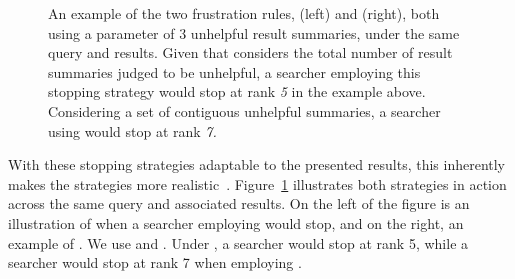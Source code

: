 \begin{figure}[t!]
    \centering
    \caption[Examples of frustration rules  and ]{An example of the two frustration rules,  (left) and  (right), both using a parameter of 3 unhelpful result summaries, under the same query and results. Given that  considers the total number of result summaries judged to be unhelpful, a searcher employing this stopping strategy would stop at rank \emph{5} in the example above. Considering a set of contiguous unhelpful summaries, a searcher using  would stop at rank \emph{7.}}
    \label{fig:ss23}
\end{figure}

With these stopping strategies adaptable to the presented results, this inherently makes the strategies more realistic~\citep{moffat2013users_versus_models}. Figure~\ref{fig:ss23} illustrates both strategies in action across the same query and associated results. On the left of the figure is an illustration of when a searcher employing  would stop, and on the right, an example of . We use  and . Under , a searcher would stop at rank 5, while a searcher would stop at rank 7 when employing .

